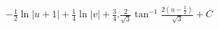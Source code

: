 \documentclass[preview]{standalone}
\begin{document}
\begin{align*}
-\frac{1}{2}\ln|u+1|+\frac{1}{4}\ln|v|+\frac{3}{4}.\frac{2}{\sqrt3}\tan^{-1}\frac{2(u-\frac{1}{2})}{\sqrt3}+C
\end{align*}
\end{document}
